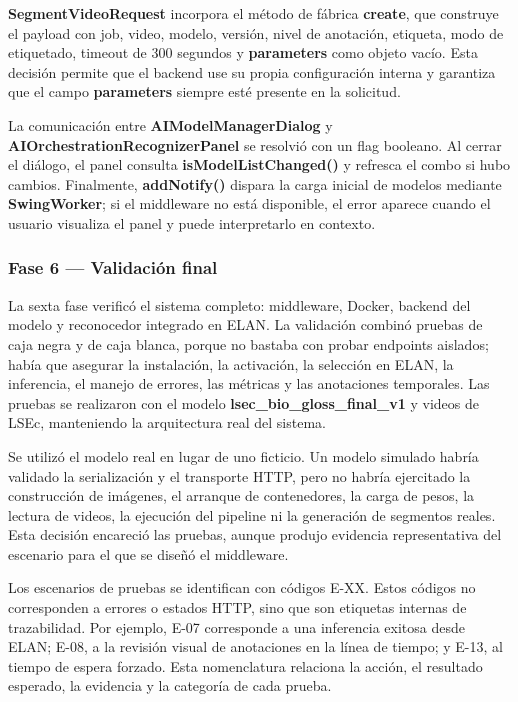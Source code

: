 \textbf{SegmentVideoRequest} incorpora el método de fábrica \textbf{create}, que construye el payload con job, video, modelo, versión, nivel de anotación, etiqueta, modo de etiquetado, timeout de 300 segundos y \textbf{parameters} como objeto vacío. Esta decisión permite que el backend use su propia configuración interna y garantiza que el campo \textbf{parameters} siempre esté presente en la solicitud.

La comunicación entre \textbf{AIModel\allowbreak{}ManagerDialog} y \textbf{AIOrchestration\allowbreak{}RecognizerPanel} se resolvió con un flag booleano. Al cerrar el diálogo, el panel consulta \textbf{isModelListChanged()} y refresca el combo si hubo cambios. Finalmente, \textbf{addNotify()} dispara la carga inicial de modelos mediante \textbf{SwingWorker}; si el middleware no está disponible, el error aparece cuando el usuario visualiza el panel y puede interpretarlo en contexto.

\subsubsection{Fase 6 — Validación final}

La sexta fase verificó el sistema completo: middleware, Docker, backend del modelo y reconocedor integrado en ELAN. La validación combinó pruebas de caja negra y de caja blanca, porque no bastaba con probar endpoints aislados; había que asegurar la instalación, la activación, la selección en ELAN, la inferencia, el manejo de errores, las métricas y las anotaciones temporales. Las pruebas se realizaron con el modelo \textbf{lsec\_bio\_gloss\_final\_v1} y videos de LSEc, manteniendo la arquitectura real del sistema.

Se utilizó el modelo real en lugar de uno ficticio. Un modelo simulado habría validado la serialización y el transporte HTTP, pero no habría ejercitado la construcción de imágenes, el arranque de contenedores, la carga de pesos, la lectura de videos, la ejecución del pipeline ni la generación de segmentos reales. Esta decisión encareció las pruebas, aunque produjo evidencia representativa del escenario para el que se diseñó el middleware.

Los escenarios de pruebas se identifican con códigos E-XX. Estos códigos no corresponden a errores o estados HTTP, sino que son etiquetas internas de trazabilidad. Por ejemplo, E-07 corresponde a una inferencia exitosa desde ELAN; E-08, a la revisión visual de anotaciones en la línea de tiempo; y E-13, al tiempo de espera forzado. Esta nomenclatura relaciona la acción, el resultado esperado, la evidencia y la categoría de cada prueba.

